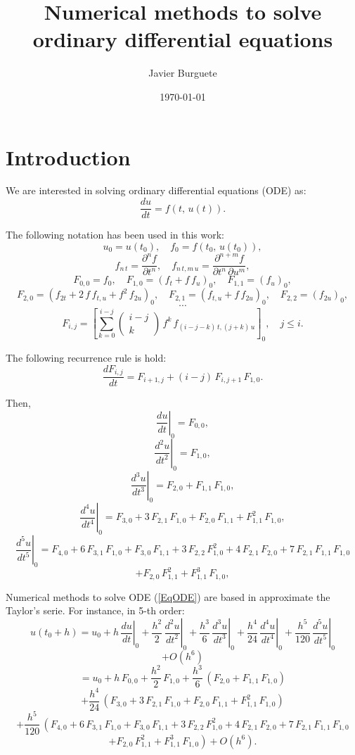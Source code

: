 \documentclass[a4paper]{article}
\title{Numerical methods to solve ordinary differential equations}
\author{Javier Burguete}
\date{\today}
\newcommand{\C}[1]{\left[#1\right]}
\newcommand{\COMB}[2]{\left(\begin{array}{c}#1\\#2\end{array}\right)}
\newcommand{\D}[3]{\DD{^{#3}#1}{#2^{#3}}}
\newcommand{\DD}[2]{\frac{d#1}{d#2}}
\newcommand{\EQ}[2]{\begin{equation}#1\label{#2}\end{equation}}
\newcommand{\PA}[1]{\left(#1\right)}
\newcommand{\PARTIAL}[2]{\frac{\partial #1}{\partial #2}}
\begin{document}
\maketitle

\tableofcontents

\section{Introduction}

We are interested in solving ordinary differential equations (ODE) as:
\EQ{\DD{u}{t}=f\PA{t,\,u(t)}.}{EqODE}

The following notation has been used in this work:
\[u_0=u\PA{t_0},\quad f_0=f\PA{t_0,\,u\PA{t_0}},\]
\[
	f_{n\,t}=\PARTIAL{^nf}{t^n},\quad
	f_{n\,t,m\,u}=\PARTIAL{^{n+m}f}{t^n\,\partial u^m},
\]
\[F_{0,0}=f_0,\quad F_{1,0}=\PA{f_t+f\,f_u}_0,\quad F_{1,1}=\PA{f_u}_0,\]
\[
	F_{2,0}=\PA{f_{2t}+2\,f\,f_{t,u}+f^2\,f_{2u}}_0,\quad
	F_{2,1}=\PA{f_{t,u}+f\,f_{2u}}_0,\quad
	F_{2,2}=\PA{f_{2u}}_0,
\]
\[\cdots\]
\[
	F_{i,j}=\C{\sum_{k=0}^{i-j}\COMB{i-j}{k}\,f^k\,f_{(i-j-k)\,t,(j+k)\,u}}_0,
	\quad j\leq i.
\]

The following recurrence rule is hold:
\EQ{\DD{F_{i,j}}{t}=F_{i+1,j}+(i-j)\,F_{i,j+1}\,F_{1,0}.}{EqdF}

Then,
\[\left.\DD{u}{t}\right|_0=F_{0,0},\]
\[\left.\D{u}{t}{2}\right|_0=F_{1,0},\]
\[\left.\D{u}{t}{3}\right|_0=F_{2,0}+F_{1,1}\,F_{1,0},\]
\[
	\left.\D{u}{t}{4}\right|_0=F_{3,0}+3\,F_{2,1}\,F_{1,0}+F_{2,0}\,F_{1,1}
	+F_{1,1}^2\,F_{1,0},
\]
\[
	\left.\D{u}{t}{5}\right|_0=F_{4,0}+6\,F_{3,1}\,F_{1,0}+F_{3,0}\,F_{1,1}
	+3\,F_{2,2}\,F_{1,0}^2+4\,F_{2,1}\,F_{2,0}+7\,F_{2,1}\,F_{1,1}\,F_{1,0}
\]
\[
	+F_{2,0}\,F_{1,1}^2+F_{1,1}^3\,F_{1,0},
\]

Numerical methods to solve ODE (\ref{EqODE}) are based in approximate the 
Taylor's serie. For instance, in 5-th order:
\[
	u\PA{t_0+h}=u_0+h\,\left.\DD{u}{t}\right|_0
	+\frac{h^2}{2}\,\left.\D{u}{t}{2}\right|_0
	+\frac{h^3}{6}\,\left.\D{u}{t}{3}\right|_0
	+\frac{h^4}{24}\,\left.\D{u}{t}{4}\right|_0
	+\frac{h^5}{120}\,\left.\D{u}{t}{5}\right|_0
\]
\[+O\PA{h^6}\]
\[
	=u_0+h\,F_{0,0}+\frac{h^2}{2}\,F_{1,0}
	+\frac{h^3}{6}\,\PA{F_{2,0}+F_{1,1}\,F_{1,0}}
\]
\[
	+\frac{h^4}{24}\,\PA{F_{3,0}+3\,F_{2,1}\,F_{1,0}+F_{2,0}\,F_{1,1}
	+F_{1,1}^2\,F_{1,0}}
\]
\[
	+\frac{h^5}{120}\,\left(F_{4,0}+6\,F_{3,1}\,F_{1,0}+F_{3,0}\,F_{1,1}
	+3\,F_{2,2}\,F_{1,0}^2+4\,F_{2,1}\,F_{2,0}+7\,F_{2,1}\,F_{1,1}\,F_{1,0}
	\right.
\]
\EQ{\left.+F_{2,0}\,F_{1,1}^2+F_{1,1}^3\,F_{1,0}\right)+O\PA{h^6}.}{EqTaylor}
\end{document}
